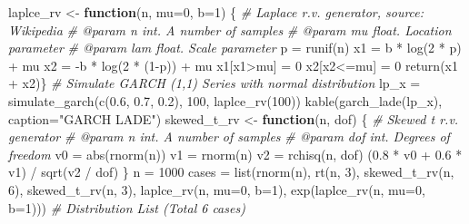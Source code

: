 \documentclass[
  11pt,
]{article}
\newenvironment{Shaded}{\begin{snugshade}}{\end{snugshade}}
\newcommand{\AttributeTok}[1]{\textcolor[rgb]{0.77,0.63,0.00}{#1}}
\newcommand{\CommentTok}[1]{\textcolor[rgb]{0.56,0.35,0.01}{\textit{#1}}}
\newcommand{\ControlFlowTok}[1]{\textcolor[rgb]{0.13,0.29,0.53}{\textbf{#1}}}
\newcommand{\DecValTok}[1]{\textcolor[rgb]{0.00,0.00,0.81}{#1}}
\newcommand{\FloatTok}[1]{\textcolor[rgb]{0.00,0.00,0.81}{#1}}
\newcommand{\FunctionTok}[1]{\textcolor[rgb]{0.00,0.00,0.00}{#1}}
\newcommand{\NormalTok}[1]{#1}
\newcommand{\OtherTok}[1]{\textcolor[rgb]{0.56,0.35,0.01}{#1}}
\newcommand{\SpecialCharTok}[1]{\textcolor[rgb]{0.00,0.00,0.00}{#1}}
\newcommand{\StringTok}[1]{\textcolor[rgb]{0.31,0.60,0.02}{#1}}
\begin{document}
\begin{Shaded}
\begin{Highlighting}[]
\NormalTok{laplce\_rv }\OtherTok{\textless{}{-}} \ControlFlowTok{function}\NormalTok{(n, }\AttributeTok{mu=}\DecValTok{0}\NormalTok{, }\AttributeTok{b=}\DecValTok{1}\NormalTok{) \{}
  \CommentTok{\#\textquotesingle{} Laplace r.v. generator, source: Wikipedia}
  \CommentTok{\#\textquotesingle{} @param n int. A number of samples}
  \CommentTok{\#\textquotesingle{} @param mu float. Location parameter}
  \CommentTok{\#\textquotesingle{} @param lam float. Scale parameter}
\NormalTok{  p }\OtherTok{=} \FunctionTok{runif}\NormalTok{(n)}
\NormalTok{  x1 }\OtherTok{=}\NormalTok{ b }\SpecialCharTok{*} \FunctionTok{log}\NormalTok{(}\DecValTok{2} \SpecialCharTok{*}\NormalTok{ p) }\SpecialCharTok{+}\NormalTok{ mu}
\NormalTok{  x2 }\OtherTok{=} \SpecialCharTok{{-}}\NormalTok{b }\SpecialCharTok{*} \FunctionTok{log}\NormalTok{(}\DecValTok{2} \SpecialCharTok{*}\NormalTok{ (}\DecValTok{1}\SpecialCharTok{{-}}\NormalTok{p)) }\SpecialCharTok{+}\NormalTok{ mu}
\NormalTok{  x1[x1}\SpecialCharTok{\textgreater{}}\NormalTok{mu] }\OtherTok{=} \DecValTok{0}
\NormalTok{  x2[x2}\SpecialCharTok{\textless{}=}\NormalTok{mu] }\OtherTok{=} \DecValTok{0}
  \FunctionTok{return}\NormalTok{(x1 }\SpecialCharTok{+}\NormalTok{ x2)\}}
\CommentTok{\# Simulate GARCH (1,1) Series with normal distribution}
\NormalTok{lp\_x }\OtherTok{=} \FunctionTok{simulate\_garch}\NormalTok{(}\FunctionTok{c}\NormalTok{(}\FloatTok{0.6}\NormalTok{, }\FloatTok{0.7}\NormalTok{, }\FloatTok{0.2}\NormalTok{), }\DecValTok{100}\NormalTok{, }\FunctionTok{laplce\_rv}\NormalTok{(}\DecValTok{100}\NormalTok{))}
\FunctionTok{kable}\NormalTok{(}\FunctionTok{garch\_lade}\NormalTok{(lp\_x), }\AttributeTok{caption=}\StringTok{"GARCH LADE"}\NormalTok{)}
\NormalTok{skewed\_t\_rv }\OtherTok{\textless{}{-}} \ControlFlowTok{function}\NormalTok{(n, dof) \{}
  \CommentTok{\#\textquotesingle{} Skewed t r.v. generator}
  \CommentTok{\#\textquotesingle{} @param n int. A number of samples}
  \CommentTok{\#\textquotesingle{} @param dof int. Degrees of freedom}
\NormalTok{  v0 }\OtherTok{=} \FunctionTok{abs}\NormalTok{(}\FunctionTok{rnorm}\NormalTok{(n))}
\NormalTok{  v1 }\OtherTok{=} \FunctionTok{rnorm}\NormalTok{(n)}
\NormalTok{  v2 }\OtherTok{=} \FunctionTok{rchisq}\NormalTok{(n, dof)}
\NormalTok{  (}\FloatTok{0.8} \SpecialCharTok{*}\NormalTok{ v0 }\SpecialCharTok{+} \FloatTok{0.6} \SpecialCharTok{*}\NormalTok{ v1) }\SpecialCharTok{/} \FunctionTok{sqrt}\NormalTok{(v2 }\SpecialCharTok{/}\NormalTok{ dof)}
\NormalTok{\}}
\NormalTok{n }\OtherTok{=} \DecValTok{1000}
\NormalTok{cases }\OtherTok{=} \FunctionTok{list}\NormalTok{(}\FunctionTok{rnorm}\NormalTok{(n), }\FunctionTok{rt}\NormalTok{(n, }\DecValTok{3}\NormalTok{), }\FunctionTok{skewed\_t\_rv}\NormalTok{(n, }\DecValTok{6}\NormalTok{), }\FunctionTok{skewed\_t\_rv}\NormalTok{(n, }\DecValTok{3}\NormalTok{), }\FunctionTok{laplce\_rv}\NormalTok{(n, }\AttributeTok{mu=}\DecValTok{0}\NormalTok{, }\AttributeTok{b=}\DecValTok{1}\NormalTok{), }\FunctionTok{exp}\NormalTok{(}\FunctionTok{laplce\_rv}\NormalTok{(n, }\AttributeTok{mu=}\DecValTok{0}\NormalTok{, }\AttributeTok{b=}\DecValTok{1}\NormalTok{))) }\CommentTok{\# Distribution List (Total 6 cases)}

\end{Highlighting}
\end{Shaded}
\end{document}
